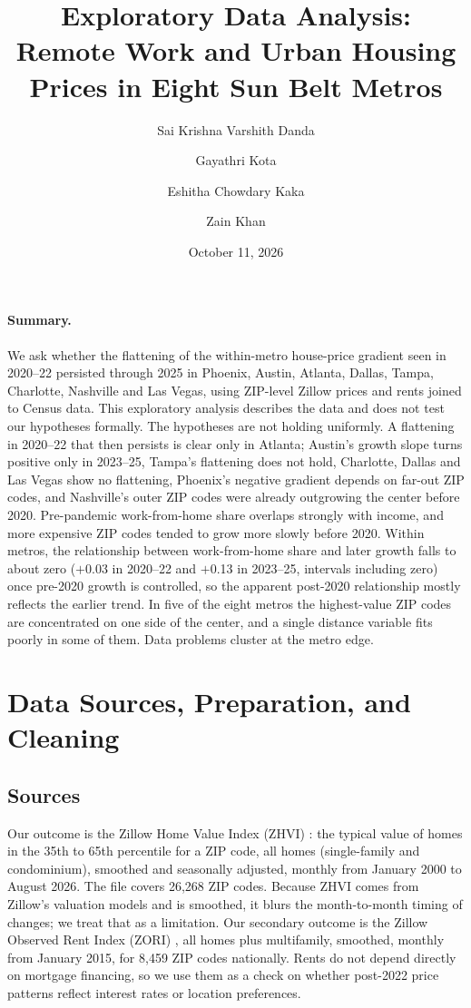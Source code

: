 \documentclass[11pt]{article}
\title{Exploratory Data Analysis:\\ Remote Work and Urban Housing Prices in Eight Sun Belt Metros}
\author[1]{Sai Krishna Varshith Danda}
\author[1]{Gayathri Kota}
\author[1]{Eshitha Chowdary Kaka}
\author[1]{Zain Khan}
\affil[1]{Arizona State University, Tempe, AZ 85281, USA}
\date{October 11, 2026}
\begin{document}
\maketitle

\paragraph{Summary.} We ask whether the flattening of the within-metro house-price gradient seen in 2020--22 persisted
through 2025 in Phoenix, Austin, Atlanta, Dallas, Tampa, Charlotte, Nashville and Las Vegas, using ZIP-level Zillow prices
and rents joined to Census data. This exploratory analysis describes the data and does not test our hypotheses formally.
The hypotheses are not holding uniformly. A flattening in 2020--22 that then persists is clear only in Atlanta; Austin's growth
slope turns positive only in 2023--25, Tampa's flattening does not hold, Charlotte, Dallas and Las Vegas show no flattening,
Phoenix's negative gradient depends on far-out ZIP codes, and Nashville's outer ZIP codes were already outgrowing the center
before 2020. Pre-pandemic work-from-home share overlaps strongly with income, and more expensive ZIP codes tended to grow more
slowly before 2020. Within metros, the relationship between work-from-home share and later growth falls to about zero ($+$0.03
in 2020--22 and $+$0.13 in 2023--25, intervals including zero) once pre-2020 growth is controlled, so the apparent post-2020
relationship mostly reflects the earlier trend. In five of the eight metros the highest-value ZIP codes are concentrated on one
side of the center, and a single distance variable fits poorly in some of them. Data problems cluster at the metro edge.

\section{Data Sources, Preparation, and Cleaning}

\subsection{Sources}
Our outcome is the Zillow Home Value Index (ZHVI) \cite{zhvi}: the typical value of homes in the 35th to 65th percentile for
a ZIP code, all homes (single-family and condominium), smoothed and seasonally adjusted, monthly from January 2000 to August
2026. The file covers 26,268 ZIP codes. Because ZHVI comes from Zillow's valuation models and is smoothed, it blurs the
month-to-month timing of changes; we treat that as a limitation. Our secondary outcome is the Zillow Observed Rent Index
(ZORI) \cite{zori}, all homes plus multifamily, smoothed, monthly from January 2015, for 8,459 ZIP codes nationally. Rents do
not depend directly on mortgage financing, so we use them as a check on whether post-2022 price patterns reflect interest
rates or location preferences.
\end{document}
